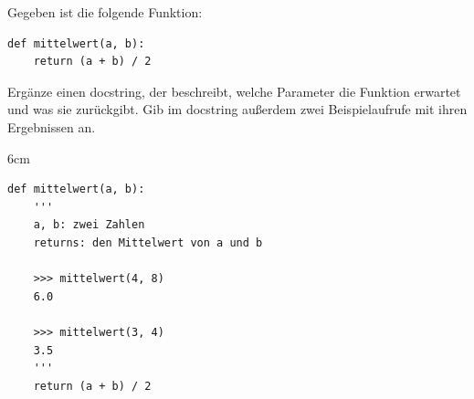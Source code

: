\question[3]
Gegeben ist die folgende Funktion:
\begin{lstlisting}
def mittelwert(a, b):
    return (a + b) / 2
\end{lstlisting}
Ergänze einen docstring, der beschreibt, welche Parameter die Funktion erwartet
und was sie zurückgibt. Gib im docstring außerdem zwei Beispielaufrufe mit ihren Ergebnissen an.

\begin{solutionbox}{6cm}
\begin{lstlisting}
def mittelwert(a, b):
    '''
    a, b: zwei Zahlen
    returns: den Mittelwert von a und b

    >>> mittelwert(4, 8)
    6.0

    >>> mittelwert(3, 4)
    3.5
    '''
    return (a + b) / 2
\end{lstlisting}
\end{solutionbox}
